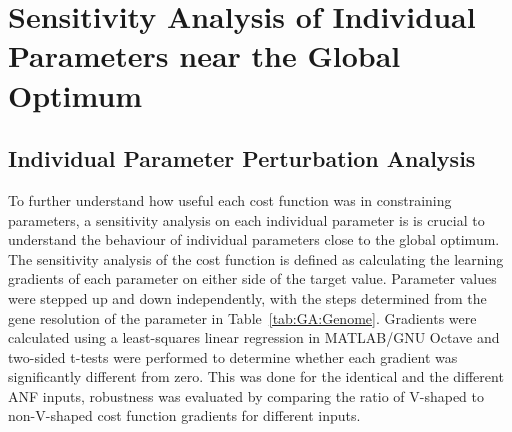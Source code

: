 
\section[Individual parameter sensitivity]{Sensitivity Analysis of Individual Parameters near the Global Optimum}\label{sec:GA:IndividualSensA}

\subsection{Individual Parameter Perturbation Analysis}\label{sec:GA:indiv-param-pert}

To further understand how useful each cost function was in
constraining parameters, a sensitivity analysis on each individual
parameter is is crucial to understand the behaviour of individual
parameters close to the global optimum.  The sensitivity analysis of
the cost function is defined as calculating the learning gradients of
each parameter on either side of the target value. Parameter values
were stepped up and down independently, with the steps determined from
the gene resolution of the parameter in
Table~\ref{tab:GA:Genome}. Gradients were calculated using a
least-squares linear regression in MATLAB/GNU Octave and two-sided
t-tests were performed to determine whether each gradient was
significantly different from zero.  This was done for the identical
and the different ANF inputs, robustness was evaluated by comparing
the ratio of V-shaped to non-V-shaped cost function gradients for
different inputs.

\smallskip{}

